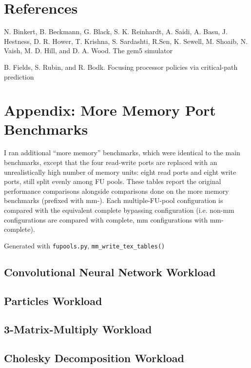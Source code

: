 \documentclass[11pt]{article}
\begin{document}
\section{References}

N. Binkert, B. Beckmann, G. Black, S. K. Reinhardt, A. Saidi, A. Basu,
J. Hestness, D. R. Hower, T. Krishna, S. Sardashti, R.Sen, K. Sewell,
M. Shoaib, N. Vaish, M. D. Hill, and D. A. Wood. The gem5 simulator

B. Fields, S. Rubin, and R. Bodk. Focusing processor policies via
critical-path prediction

\section{Appendix: More Memory Port Benchmarks}

I ran additional ``more memory'' benchmarks, which were identical to
the main benchmarks, except that the four read-write ports are
replaced with an unrealistically high number of memory units: eight
read ports and eight write ports, still split evenly among FU
pools. These tables report the original performance comparisons
alongside comparisons done on the more memory benchmarks (prefixed
with mm-). Each multiple-FU-pool configuration is compared with the
equivalent complete bypassing configuration (i.e. non-mm
configurations are compared with complete, mm configurations with
mm-complete).

Generated with \texttt{fupools.py}, \texttt{mm\_write\_tex\_tables()}

\subsection{Convolutional Neural Network Workload}



\subsection{Particles Workload}



\subsection{3-Matrix-Multiply Workload}



\subsection{Cholesky Decomposition Workload}


\end{document}
